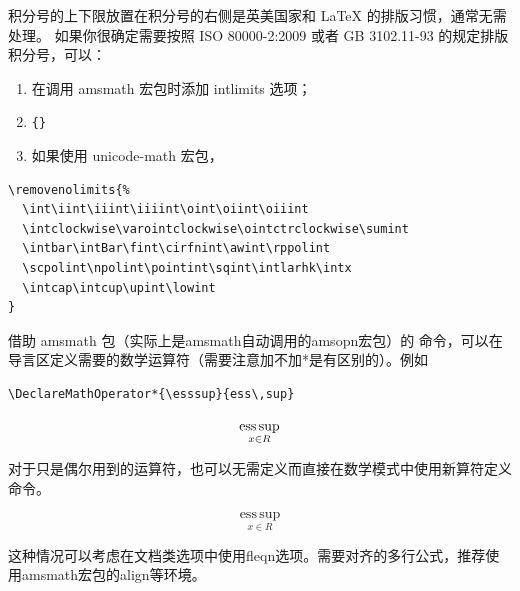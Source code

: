 

积分号的上下限放置在积分号的右侧是英美国家和 \LaTeX{}
的排版习惯，通常无需处理。
如果你很确定需要按照 ISO 80000-2:2009 或者 GB 3102.11-93 的规定排版积分号，可以：

\begin{enumerate}
\def\labelenumi{\arabic{enumi}.}

\item
  在调用 amsmath 宏包时添加 intlimits 选项；
\item
  \texttt{\{\}}
\item
  如果使用 unicode-math 宏包，
\end{enumerate}

\begin{verbatim}
\removenolimits{%
  \int\iint\iiint\iiiint\oint\oiint\oiiint
  \intclockwise\varointclockwise\ointctrclockwise\sumint
  \intbar\intBar\fint\cirfnint\awint\rppolint
  \scpolint\npolint\pointint\sqint\intlarhk\intx
  \intcap\intcup\upint\lowint
}
\end{verbatim}



借助 amsmath 包（实际上是amsmath自动调用的amsopn宏包）的
 命令，可以在导言区定义需要的数学运算符（需要注意加不加*是有区别的）。例如

\begin{verbatim}
\DeclareMathOperator*{\esssup}{ess\,sup}
\end{verbatim}

\begin{example}
\[ 
  \esssup_{x\in {R}} 
\]
\end{example}


对于只是偶尔用到的运算符，也可以无需定义而直接在数学模式中使用新算符定义命令。
%

\begin{example}
\[
  \operatorname*{ess\,sup}_{x\in {R}}
\]
\end{example}

这种情况可以考虑在文档类选项中使用fleqn选项。需要对齐的多行公式，推荐使用amsmath宏包的align等环境。

